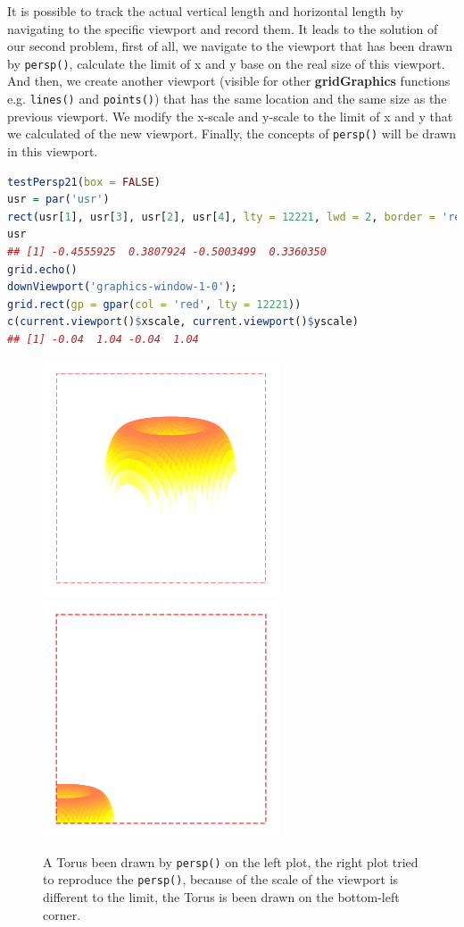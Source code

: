 \documentclass[11pt,twoside]{report}
\begin{document}
\newpage
It is possible to track the actual vertical length and horizontal length by navigating to the specific viewport and record them. It leads to the solution of our second problem, first of all, we navigate to the viewport that has been drawn by \texttt{persp()}, calculate the limit of x and y base on the real size of this viewport. And then, we create another viewport (visible for other \textbf{gridGraphics} functions e.g. \texttt{lines()} and \texttt{points()}) that has the same location and the same size as the previous viewport. We modify the x-scale and y-scale to the limit of x and y that we calculated of the new viewport. Finally, the concepts of \texttt{persp()} will be drawn in this viewport. \\

\begin{lstlisting}[language = R]
testPersp21(box = FALSE)
usr = par('usr')
rect(usr[1], usr[3], usr[2], usr[4], lty = 12221, lwd = 2, border = 'red')
usr
## [1] -0.4555925  0.3807924 -0.5003499  0.3360350
grid.echo()
downViewport('graphics-window-1-0'); 
grid.rect(gp = gpar(col = 'red', lty = 12221))
c(current.viewport()$xscale, current.viewport()$yscale)
## [1] -0.04  1.04 -0.04  1.04
\end{lstlisting}

\begin{figure}[h]
	\begin{center}
		\includegraphics[height = 7cm, width = 7cm]{figure/gridGraphics_persp_demo_viewport_1.pdf}
		\includegraphics[height = 7cm, width = 7cm]{figure/gridGraphics_persp_demo_viewport_2.pdf}
		\caption{A Torus been drawn by \texttt{persp()} on the left plot, the right plot tried to reproduce the \texttt{persp()}, because of the scale of the viewport is different to the limit, the Torus is been drawn on the bottom-left corner.}
		\label{figure_4.3}
	\end{center}
\end{figure}
\end{document}
